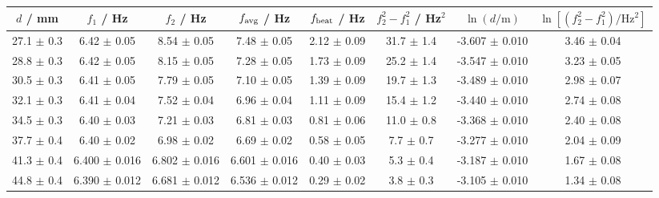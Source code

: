 \begin{tabular}{@{}cccccccc@{}}
\toprule
$d$ / mm & $f_1$ / Hz & $f_2$ / Hz & $f_{\rm avg}$ / Hz & $f_{\rm beat}$ / Hz & $f_2^2-f_1^2$ / Hz$^2$ & $\ln(d/\mathrm{m})$ & $\ln[(f_2^2-f_1^2)/\mathrm{Hz^2}]$ \\
\midrule
27.1 $\pm$ 0.3 & 6.42 $\pm$ 0.05 & 8.54 $\pm$ 0.05 & 7.48 $\pm$ 0.05 & 2.12 $\pm$ 0.09 & 31.7 $\pm$ 1.4 & -3.607 $\pm$ 0.010 & 3.46 $\pm$ 0.04 \\
28.8 $\pm$ 0.3 & 6.42 $\pm$ 0.05 & 8.15 $\pm$ 0.05 & 7.28 $\pm$ 0.05 & 1.73 $\pm$ 0.09 & 25.2 $\pm$ 1.4 & -3.547 $\pm$ 0.010 & 3.23 $\pm$ 0.05 \\
30.5 $\pm$ 0.3 & 6.41 $\pm$ 0.05 & 7.79 $\pm$ 0.05 & 7.10 $\pm$ 0.05 & 1.39 $\pm$ 0.09 & 19.7 $\pm$ 1.3 & -3.489 $\pm$ 0.010 & 2.98 $\pm$ 0.07 \\
32.1 $\pm$ 0.3 & 6.41 $\pm$ 0.04 & 7.52 $\pm$ 0.04 & 6.96 $\pm$ 0.04 & 1.11 $\pm$ 0.09 & 15.4 $\pm$ 1.2 & -3.440 $\pm$ 0.010 & 2.74 $\pm$ 0.08 \\
34.5 $\pm$ 0.3 & 6.40 $\pm$ 0.03 & 7.21 $\pm$ 0.03 & 6.81 $\pm$ 0.03 & 0.81 $\pm$ 0.06 & 11.0 $\pm$ 0.8 & -3.368 $\pm$ 0.010 & 2.40 $\pm$ 0.08 \\
37.7 $\pm$ 0.4 & 6.40 $\pm$ 0.02 & 6.98 $\pm$ 0.02 & 6.69 $\pm$ 0.02 & 0.58 $\pm$ 0.05 & 7.7 $\pm$ 0.7 & -3.277 $\pm$ 0.010 & 2.04 $\pm$ 0.09 \\
41.3 $\pm$ 0.4 & 6.400 $\pm$ 0.016 & 6.802 $\pm$ 0.016 & 6.601 $\pm$ 0.016 & 0.40 $\pm$ 0.03 & 5.3 $\pm$ 0.4 & -3.187 $\pm$ 0.010 & 1.67 $\pm$ 0.08 \\
44.8 $\pm$ 0.4 & 6.390 $\pm$ 0.012 & 6.681 $\pm$ 0.012 & 6.536 $\pm$ 0.012 & 0.29 $\pm$ 0.02 & 3.8 $\pm$ 0.3 & -3.105 $\pm$ 0.010 & 1.34 $\pm$ 0.08 \\
\bottomrule
\end{tabular}